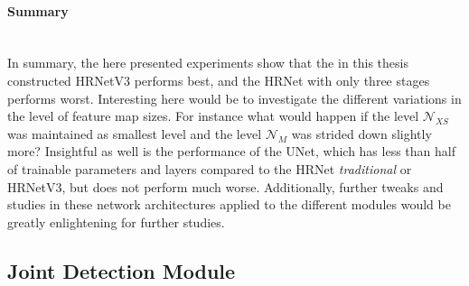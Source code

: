 \paragraph{Summary}\mbox{}\\
In summary, the here presented experiments show that the in this thesis constructed HRNetV3 performs best, and the HRNet with only three stages performs
worst.
Interesting here would be to investigate the different variations in the level of feature map sizes.
For instance what would happen if the level $\mathcal{N}_{XS}$ was maintained as smallest level and the level
$\mathcal{N}_M$ was strided down slightly more?
Insightful as well is the performance of the UNet, which has less than half of trainable parameters and layers compared to
the HRNet \textit{traditional} or HRNetV3, but does not perform much worse.
Additionally, further tweaks and studies in these network architectures applied to the different modules would be
greatly enlightening for further studies.


\subsection{Joint Detection Module }

